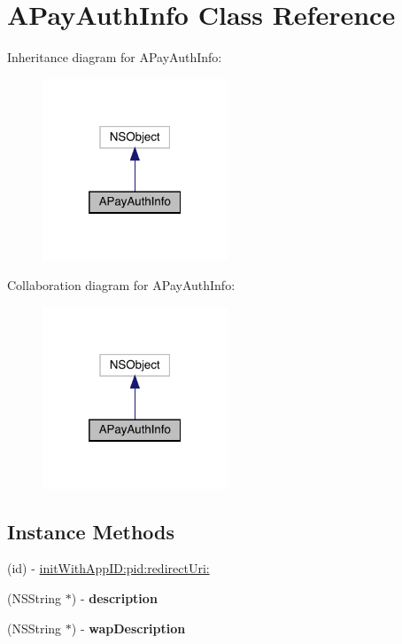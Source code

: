 \hypertarget{interface_a_pay_auth_info}{}\section{A\+Pay\+Auth\+Info Class Reference}
\label{interface_a_pay_auth_info}


Inheritance diagram for A\+Pay\+Auth\+Info\+:\nopagebreak
\begin{figure}[H]
\begin{center}
\leavevmode
\includegraphics[width=157pt]{interface_a_pay_auth_info__inherit__graph}
\end{center}
\end{figure}


Collaboration diagram for A\+Pay\+Auth\+Info\+:\nopagebreak
\begin{figure}[H]
\begin{center}
\leavevmode
\includegraphics[width=157pt]{interface_a_pay_auth_info__coll__graph}
\end{center}
\end{figure}
\subsection*{Instance Methods}
\begin{DoxyCompactItemize}
\item 
(id) -\/ \mbox{\hyperlink{interface_a_pay_auth_info_a0864395a61010f44e94e9f3b843576e7}{init\+With\+App\+I\+D\+:pid\+:redirect\+Uri\+:}}
\item 
\mbox{\label{interface_a_pay_auth_info_a724fb175364f4afc4084fd1d323e1a74}} 
(N\+S\+String $\ast$) -\/ {\bfseries description}
\item 
\mbox{\label{interface_a_pay_auth_info_a490609565bbc7abfcbc737a3e82d9e2f}} 
(N\+S\+String $\ast$) -\/ {\bfseries wap\+Description}
\end{DoxyCompactItemize}
